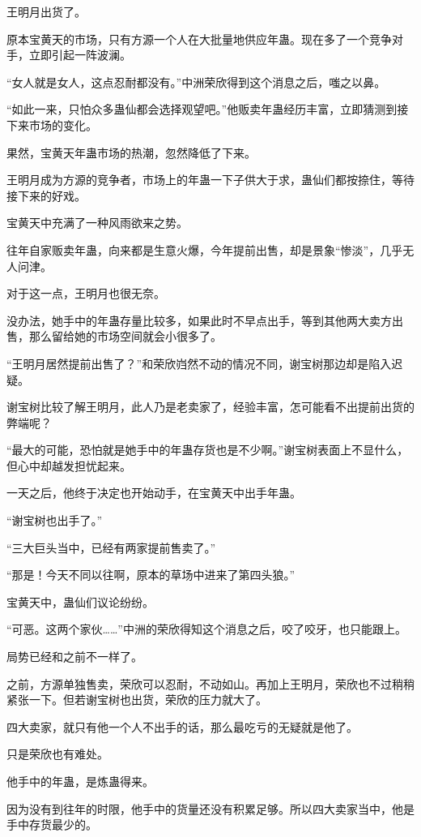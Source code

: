 
\begin{this_body}

王明月出货了。

原本宝黄天的市场，只有方源一个人在大批量地供应年蛊。现在多了一个竞争对手，立即引起一阵波澜。

“女人就是女人，这点忍耐都没有。”中洲荣欣得到这个消息之后，嗤之以鼻。

“如此一来，只怕众多蛊仙都会选择观望吧。”他贩卖年蛊经历丰富，立即猜测到接下来市场的变化。

果然，宝黄天年蛊市场的热潮，忽然降低了下来。

王明月成为方源的竞争者，市场上的年蛊一下子供大于求，蛊仙们都按捺住，等待接下来的好戏。

宝黄天中充满了一种风雨欲来之势。

往年自家贩卖年蛊，向来都是生意火爆，今年提前出售，却是景象“惨淡”，几乎无人问津。

对于这一点，王明月也很无奈。

没办法，她手中的年蛊存量比较多，如果此时不早点出手，等到其他两大卖方出售，那么留给她的市场空间就会小很多了。

“王明月居然提前出售了？”和荣欣岿然不动的情况不同，谢宝树那边却是陷入迟疑。

谢宝树比较了解王明月，此人乃是老卖家了，经验丰富，怎可能看不出提前出货的弊端呢？

“最大的可能，恐怕就是她手中的年蛊存货也是不少啊。”谢宝树表面上不显什么，但心中却越发担忧起来。

一天之后，他终于决定也开始动手，在宝黄天中出手年蛊。

“谢宝树也出手了。”

“三大巨头当中，已经有两家提前售卖了。”

“那是！今天不同以往啊，原本的草场中进来了第四头狼。”

宝黄天中，蛊仙们议论纷纷。

“可恶。这两个家伙……”中洲的荣欣得知这个消息之后，咬了咬牙，也只能跟上。

局势已经和之前不一样了。

之前，方源单独售卖，荣欣可以忍耐，不动如山。再加上王明月，荣欣也不过稍稍紧张一下。但若谢宝树也出货，荣欣的压力就大了。

四大卖家，就只有他一个人不出手的话，那么最吃亏的无疑就是他了。

只是荣欣也有难处。

他手中的年蛊，是炼蛊得来。

因为没有到往年的时限，他手中的货量还没有积累足够。所以四大卖家当中，他是手中存货最少的。


\end{this_body}
